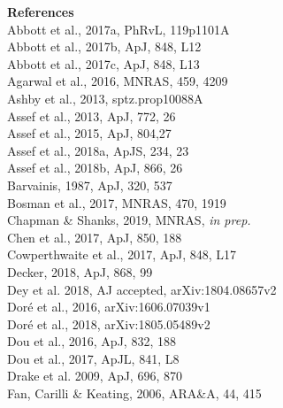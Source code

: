 \documentclass[12pt]{article}
\begin{document}


%
%
%
%
\pagebreak
\noindent
\textbf{References} \\
Abbott et al., 2017a,  PhRvL, 119p1101A	\\
Abbott et al., 2017b, ApJ, 848, L12	\\
Abbott et al., 2017c, ApJ, 848, L13	\\
Agarwal et al., 2016,  MNRAS, 459, 4209 \\
Ashby et al., 2013, sptz.prop10088A \\
Assef et al., 2013, ApJ, 772, 26      \\       %
Assef et al., 2015,  ApJ, 804,27 \\            %
Assef et al., 2018a,  ApJS, 234, 23	\\     %
Assef et al., 2018b, ApJ, 866, 26 \\          %
Barvainis, 1987, ApJ, 320, 537 \\
Bosman et al., 2017, MNRAS, 470, 1919 \\
Chapman \& Shanks, 2019, MNRAS, {\it in prep.} \\
Chen et al., 2017, ApJ, 850, 188 \\
Cowperthwaite et al., 2017,  ApJ, 848, L17	\\
Decker, 2018, ApJ, 868, 99 \\	
Dey et al. 2018, AJ accepted, arXiv:1804.08657v2 \\
Dor{\'e} et al., 2016, arXiv:1606.07039v1\\
Dor{\'e} et al., 2018, arXiv:1805.05489v2 \\
Dou et al., 2016, ApJ, 832, 188 \\ 
Dou et al., 2017, ApJL, 841, L8 \\
Drake et al. 2009, ApJ, 696, 870 \\
Fan, Carilli \& Keating, 2006, ARA\&A, 44, 415 \\
\end{document}
